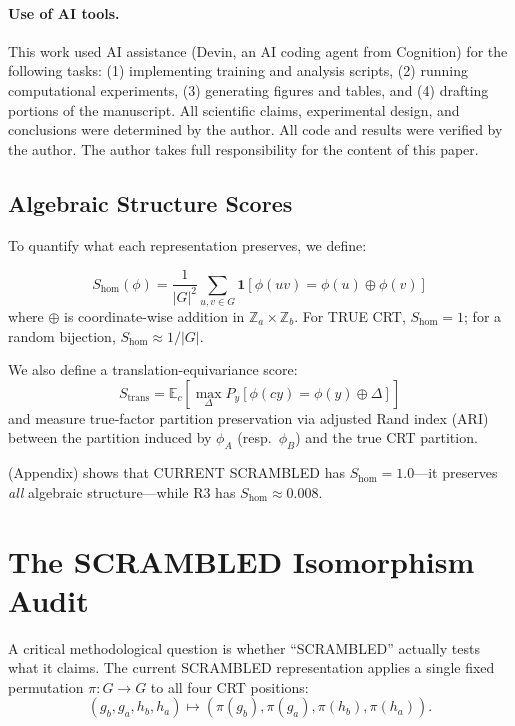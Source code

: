 \documentclass[11pt,a4paper]{article}
\theoremstyle{definition}
\theoremstyle{remark}
\newcommand{\Z}{\mathbb{Z}}
\newcommand{\E}{\mathbb{E}}
\newcommand{\Shom}{S_{\mathrm{hom}}}
\newcommand{\Strans}{S_{\mathrm{trans}}}
\begin{document}
\paragraph{Use of AI tools.} This work used AI assistance (Devin, an AI coding agent from Cognition) for the following tasks: (1) implementing training and analysis scripts, (2) running computational experiments, (3) generating figures and tables, and (4) drafting portions of the manuscript. All scientific claims, experimental design, and conclusions were determined by the author. All code and results were verified by the author. The author takes full responsibility for the content of this paper.

\subsection{Algebraic Structure Scores}
\label{sec:structure_scores}

To quantify what each representation preserves, we define:

\begin{equation}
    \Shom(\phi) = \frac{1}{|G|^2} \sum_{u,v \in G} \mathbf{1}[\phi(uv) = \phi(u) \oplus \phi(v)]
\end{equation}
where $\oplus$ is coordinate-wise addition in $\Z_a \times \Z_b$. For TRUE CRT, $\Shom = 1$; for a random bijection, $\Shom \approx 1/|G|$.

We also define a translation-equivariance score:
\begin{equation}
    \Strans = \E_c \left[\max_\Delta P_y[\phi(cy) = \phi(y) \oplus \Delta]\right]
\end{equation}
and measure true-factor partition preservation via adjusted Rand index (ARI) between the partition induced by $\phi_A$ (resp.\ $\phi_B$) and the true CRT partition.

 (Appendix) shows that CURRENT SCRAMBLED has $\Shom = 1.0$---it preserves \emph{all} algebraic structure---while R3 has $\Shom \approx 0.008$.

\section{The SCRAMBLED Isomorphism Audit}
\label{sec:audit}

A critical methodological question is whether ``SCRAMBLED'' actually tests what it claims. The current SCRAMBLED representation applies a single fixed permutation $\pi: G \to G$ to all four CRT positions:
\begin{equation}
    (g_b, g_a, h_b, h_a) \mapsto (\pi(g_b), \pi(g_a), \pi(h_b), \pi(h_a)).
\end{equation}
\end{document}
